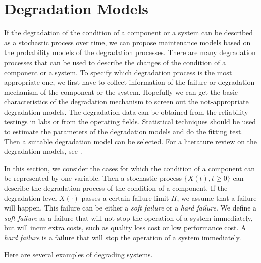 \documentclass[10pt,a4paper]{article}
\theoremstyle{remark}
\begin{document}
\section{Degradation Models}

If the degradation of the condition of a component or a system can be described as a stochastic process over time, we can propose maintenance models based on the probability models of the degradation processes. There are many degradation processes that can be used to describe the changes of the condition of a component or a system. To specify which degradation process is the most appropriate one, we first have to collect information of the failure or degradation mechanism of the component or the system. Hopefully we can get the basic characteristics of the degradation mechanism to screen out the not-appropriate degradation models. The degradation data can be obtained from the reliability testings in labs or from the operating fields. Statistical techniques should be used to estimate the parameters of the degradation models and do the fitting test. Then a suitable degradation model can be selected. For a literature review on the degradation models, see \cite{ZhuPengvanHoutum14}. 

In this section, we consider the cases for which the condition of a component can be represented by one variable. Then a stochastic process $\{X(t),t\geq 0\}$ can describe the degradation process of the condition of a component. If the degradation level $X(\cdot)$ passes a certain failure limit $H$, we assume that a failure will happen. This failure can be either a \textit{soft failure} or a \textit{hard failure}. We define a \textit{soft failure} as a failure that will not stop the operation of a system immediately, but will incur extra costs, such as quality loss cost or low performance cost. A \textit{hard failure} is a failure that will stop the operation of a system immediately. 

Here are several examples of degrading systems.
\end{document}
